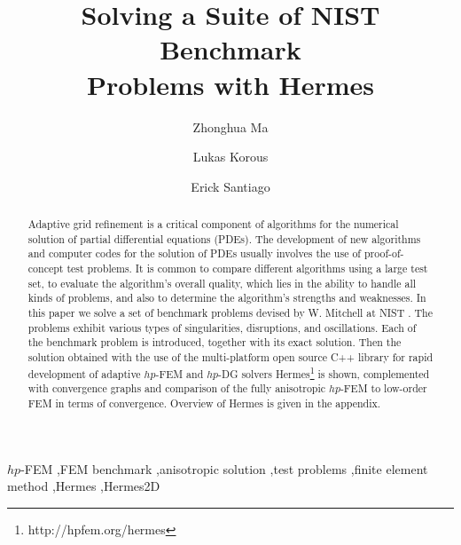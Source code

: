\documentclass[12pt]{elsarticle}
\begin{document}
\begin{frontmatter}



\title{Solving a Suite of NIST Benchmark \\Problems with Hermes}

\author[label1]{Zhonghua Ma}
\author[label2]{Lukas Korous}
\author[label3]{Erick Santiago}
\address[label1]{China University of Petroleum, Beijing, China}
\address[label2]{Charles University, Prague, Czech Republic}
\address[label3]{University of Nevada, Reno, USA}

\begin{abstract}
Adaptive grid refinement is a critical component of algorithms for the numerical solution of partial differential equations (PDEs).
The development of new algorithms and computer
codes for the solution of PDEs usually involves the use of proof-of-concept test problems.
It is common to compare different algorithms using a large test set, to evaluate the algorithm's overall quality, which lies in the ability to handle all kinds of problems, and also to determine the algorithm's strengths and weaknesses.
In this paper we solve a set of benchmark problems devised by
W. Mitchell at NIST \cite{mitchell-1}.
The problems exhibit various types of singularities, disruptions, and oscillations.
Each of the benchmark problem is introduced, together with its exact solution.
Then the solution obtained with the use of the multi-platform open source
C++ library for rapid development of adaptive $hp$-FEM and $hp$-DG solvers {\sc Hermes}\footnote{http://hpfem.org/hermes} is shown,
complemented with convergence graphs and comparison of the fully anisotropic
$hp$-FEM to low-order FEM in terms of convergence.
Overview of Hermes is given in the appendix.
\end{abstract}

\begin{keyword}
$hp$-FEM \sep FEM benchmark \sep anisotropic solution \sep test problems \sep finite element method \sep Hermes \sep Hermes2D
\end{keyword}

\end{frontmatter}
\end{document}

